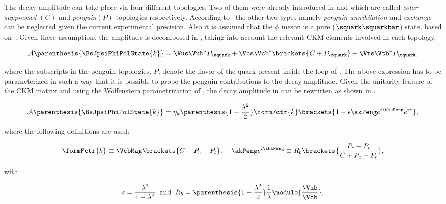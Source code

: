 The \BsJpsiPhi decay amplitude can take place via four different topologies.
Two of them were already introduced in  and  which are called {\it color suppressed }$(C)$ and {\it penguin}$(P)$
topologies respectively. According to~\cite{DeBruyn-thesis} the other two types namely {\it penguin-annihilation} and {\it exchange} can be neglected
given the current experimental precision. Also it is assumed that the $\phi$ meson is a pure ($\squark\squarkbar$) state, based on~\cite{Faller:2008gt}.
Given these assumptions the \BsJpsiPhi amplitude is decomposed in , taking into account the relevant CKM elements involved in each topology.

\begin{equation}
\mathcal{A} \parenthesis{\BsJpsiPhiPolState{k}} = \Vus\Vub^*P_{\uquark} + \Vcs\Vcb^*\brackets{C +P_{\cquark}} + \Vts\Vtb^*P_{\tquark},
 \label{bsjpsiphi_amp}
\end{equation}

\noindent where the subscripts in the penguin topologies, $P$, denote the flavor of the quark present inside the loop of .
The above expression has to be parameterized in such a way that it is possible to probe the penguin contributions to
the \BsJpsiPhi decay amplitude. Given the unitarity feature of the CKM matrix and using the Wolfenstein parametrization
of , the decay amplitude in  can be rewritten as shown in .

\begin{equation}
  \mathcal{A} \parenthesis{\BsJpsiPhiPolState{k}} = \eta_k  \parenthesis{1-\frac{\lambda^2}{2}} \formFctr{k} \brackets{ 1 - \epsilon \akPeng e^{i\thkPeng} e^{i\gamma} },
 \label{bsjpsiphi_amp_param}
\end{equation}

\noindent where the following definitions are used:

\begin{equation}
  \formFctr{k} \equiv \VcbMag \brackets{C + P_c - P_t}, \;\;\;\; \akPeng e^{i\thkPeng} \equiv R_b \brackets{ \frac{P_c - P_t}{C + P_c - P_t} },
  \label{bsjpsiphi_amp_param_defs}
\end{equation}

\noindent with

\begin{equation}
  \epsilon = \frac{\lambda^2}{1-\lambda^2} \;\;\text{and} \;\;  R_b = \parenthesis{1-\frac{\lambda^2}{2}} \frac{1}{\lambda} \modulo{\frac{\Vub}{\Vcb}},
  \label{bsjpsiphi_amp_param_defs_II}
\end{equation}

